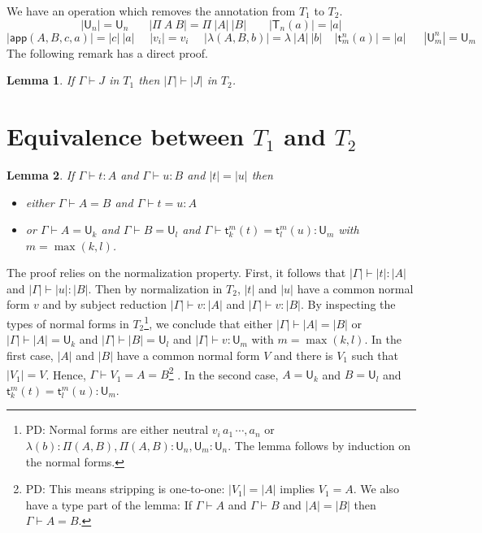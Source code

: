 \documentclass[11pt,a4paper]{article}
\newtheorem{lemma}{Lemma}[theorem]
\theoremstyle{definition}
\def\UU{\mathsf{U}}
\newcommand{\LAM}{\lambda}
\newcommand{\APP}{\mathsf{app}}
\newcommand{\T}{\mathsf{T}}
\newcommand{\sT}{\mathsf{t}}
\begin{document}
\medskip

We have an operation which removes the annotation from $T_1$ to $T_2$.
$$
|\UU_n| = \UU_n~~~~~~~~|\Pi~A~B| = \Pi~|A|~|B|~~~~~~~~~|\T_n(a)| = |a|
$$
$$
|\APP(A,B,c,a)| = |c|~|a|~~~~~~|v_i| = v_i~~~~~~|\LAM(A,B,b)| = \lambda~|A|~|b|~~~~~|\sT_m^n(a)| = |a|
~~~~~~~|\UU^n_m| = \UU_m
$$
The following remark has a direct proof.

\begin{lemma}
  If $\Gamma\vdash J$ in $T_1$ then $|\Gamma|\vdash |J|$ in $T_2$.
\end{lemma}


\section{Equivalence between $T_1$ and $T_2$}



\begin{lemma}
  If $\Gamma\vdash t:A$ and $\Gamma\vdash u:B$ and $|t| = |u|$ then
  \begin{itemize}
    \item either $\Gamma\vdash A = B$
      and $\Gamma\vdash t = u:A$
    \item or $\Gamma\vdash A = \UU_k$ and $\Gamma\vdash B = \UU_l$ and $\Gamma\vdash \sT_k^m(t) = \sT_l^m(u):\UU_m$ with $m = \max(k,l)$.
  \end{itemize}
\end{lemma}

The proof relies on the normalization property. First, it follows that $|\Gamma | \vdash |t|:|A|$ and $|\Gamma | \vdash |u|:|B|$. Then by normalization in $T_2$, $| t |$ and $| u |$ have a common normal form $v$  and by subject reduction
$|\Gamma | \vdash v : |A|$ and $|\Gamma | \vdash v : |B|$. By inspecting the types of normal forms in $T_2$\footnote{PD: Normal forms are either neutral $v_i\,a_1\,\cdots,a_n$ or $\lambda(b) : \Pi(A,B), \Pi(A,B) : \UU_n, \UU_m : \UU_n$. The lemma follows by induction on the normal forms.}, we conclude that either $|\Gamma | \vdash |A| = |B|$ or $|\Gamma | \vdash |A| = \UU_k$ and $|\Gamma | \vdash |B| = \UU_l$ and $|\Gamma | \vdash v :\UU_m$ with $m = \max(k,l)$. In the first case,  $|A|$ and $|B|$ have a common normal form $V$ and there is $V_1$ such that $| V_1 |  = V$. Hence, $\Gamma \vdash V_1 = A = B$\footnote{PD: This means stripping is one-to-one: $|V_1| = |A|$ implies $V_1 = A$. We also have a type part of the lemma: If $\Gamma\vdash A$ and $\Gamma\vdash B$ and $|A| = |B|$ then $\Gamma\vdash A = B$. } . In the second case, $A = \UU_k$ and $B = \UU_l$ and $\sT_k^m(t) = \sT_l^m(u):\UU_m$.
\end{document}
